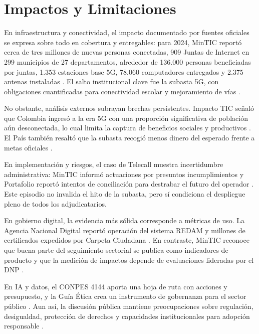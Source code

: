\documentclass[9pt,a4paper,twoside]{rho-class/rho}
\begin{document}
\section{Impactos y Limitaciones}

En infraestructura y conectividad, el impacto documentado por fuentes oficiales se expresa sobre todo en cobertura y entregables: para 2024, MinTIC reportó cerca de tres millones de nuevas personas conectadas, 909 Juntas de Internet en 299 municipios de 27 departamentos, alrededor de 136.000 personas beneficiadas por juntas, 1.353 estaciones base 5G, 78.060 computadores entregados y 2.375 antenas instaladas \cite{mintic_rendicion_cuentas_2024}. El salto institucional clave fue la subasta 5G, con obligaciones cuantificadas para conectividad escolar y mejoramiento de vías \cite{mintic_5g_realidad_2023}.

No obstante, análisis externos subrayan brechas persistentes. Impacto TIC señaló que Colombia ingresó a la era 5G con una proporción significativa de población aún desconectada, lo cual limita la captura de beneficios sociales y productivos \cite{castro_5g_colombia_2023}. El País también resaltó que la subasta recogió menos dinero del esperado frente a metas oficiales \cite{lewin_subasta_5g_el_pais_2023}.

En implementación y riesgos, el caso de Telecall muestra incertidumbre administrativa: MinTIC informó actuaciones por presuntos incumplimientos y Portafolio reportó intentos de conciliación para destrabar el futuro del operador \cite{mintic_telecall_espectro_5g_2025,lorduy_telecall_conciliacion_2026}. Este episodio no invalida el hito de la subasta, pero sí condiciona el despliegue pleno de todos los adjudicatarios.

En gobierno digital, la evidencia más sólida corresponde a métricas de uso. La Agencia Nacional Digital reportó operación del sistema REDAM y millones de certificados expedidos por Carpeta Ciudadana \cite{and_informe_gestion_2024}. En contraste, MinTIC reconoce que buena parte del seguimiento sectorial se publica como indicadores de producto y que la medición de impactos depende de evaluaciones lideradas por el DNP \cite{mintic_indicadores_impacto_2026}.

En IA y datos, el CONPES 4144 aporta una hoja de ruta con acciones y presupuesto, y la Guía Ética crea un instrumento de gobernanza para el sector público \cite{vanegas_conpes_4144_2025,mintic_guia_etica_ia_2026}. Aun así, la discusión pública mantiene preocupaciones sobre regulación, desigualdad, protección de derechos y capacidades institucionales para adopción responsable \cite{elpais_colombia_ia_politica_2025}.
\end{document}
